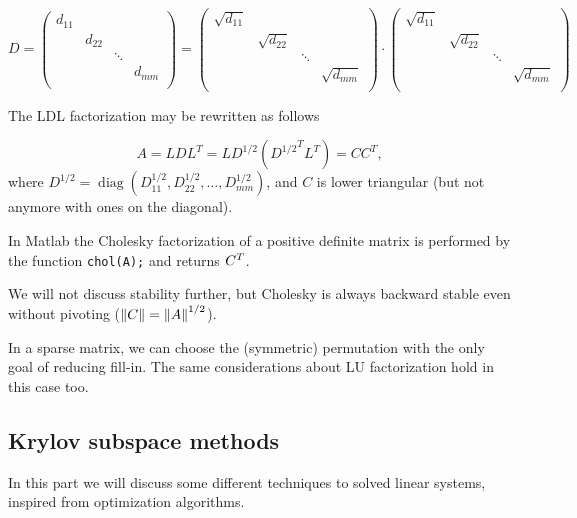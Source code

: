 \documentclass[computationalMathematics.tex]{subfiles}
\begin{document}
$D = \begin{pmatrix}
  d_{11}&&\\
  &d_{22} &\\
  && \ddots\\
  &&& d_{mm}\\
\end{pmatrix} = \begin{pmatrix}
  \sqrt{d_{11}}&&\\
  &\sqrt{d_{22}} &\\
  && \ddots\\
  &&& \sqrt{d_{mm}}\\
\end{pmatrix} \cdot
\begin{pmatrix}
  \sqrt{d_{11}}&&\\
  &\sqrt{d_{22}} &\\
  && \ddots\\
  &&& \sqrt{d_{mm}}\\
\end{pmatrix}
$

The LDL factorization may be rewritten as follows

\[
A = LDL^T = LD^{1/2} ({D^{1/2}}^T L^T) = C C^T,
\]
where $D^{1/2} = \operatorname{diag}(D_{11}^{1/2}, D_{22}^{1/2},\dots,D_{mm}^{1/2})$, and $C$ is lower triangular (but not anymore with ones on the diagonal).

In Matlab the Cholesky factorization of a positive definite matrix is performed by the function \texttt{chol(A);} and returns ${C}^{T}$.

\begin{obs}
We will not discuss stability further, but Cholesky is always backward stable even without pivoting ($\left\lVert C\right\rVert=\left\lVert A\right\rVert^{1/2}$).
\end{obs}


\begin{obs}
In a sparse matrix, we can choose the (symmetric) permutation with the only goal of reducing fill-in. The same considerations about LU factorization hold in this case too.
\end{obs}

\subsection{Krylov subspace methods}

In this part we will discuss some different techniques to solved linear systems, inspired from optimization algorithms.
\end{document}
